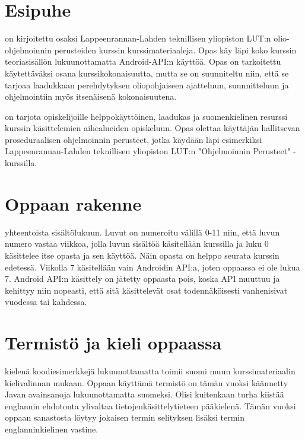 \documentclass{tufte-book}
\newcommand{\lutin}{Lappeenrannan-Lahden teknillisen yliopiston LUT:n }
\begin{document}

\section{Esipuhe}
\label{esipuhe}

 on kirjoitettu osaksi \lutin olio-ohjelmoinnin perusteiden kurssin
kurssimateriaaleja. Opas käy läpi koko kurssin  teoriasisällön lukuunottamatta Android-API:n
käyttöä. Opas on tarkoitettu käytettäväksi osana kurssikokonaisuutta, mutta se on suunniteltu
niin, että se tarjoaa laadukkaan perehdytyksen oliopohjaiseen ajatteluun, suunnitteluun ja
ohjelmointiin myös itsenäisenä kokonaisuutena.

 on tarjota opiskelijoille helppokäyttöinen,
laadukas ja suomenkielinen resurssi kurssin käsittelemien aihealueiden
opiskeluun. Opas olettaa käyttäjän hallitsevan proseduraalisen ohjelmoinnin
perusteet, jotka käydään läpi esimerkiksi \lutin "Ohjelmoinnin Perusteet" 
-kurssilla.


\section{Oppaan rakenne}
\label{rakenteesta}

 yhteentoista sisältölukuun. Luvut on numeroitu välillä 0-11 niin, että
luvun numero vastaa viikkoa, jolla luvun sisältöä käsitellään kurssilla ja luku 0 käsittelee itse
opasta ja sen käyttöä. Näin opasta on helppo seurata kurssin edetessä. Viikolla 7 käsitellään vain
Androidin API:a, joten oppaassa ei ole lukua 7. Android API:n käsittely on jätetty oppaasta pois,
koska API muuttuu ja kehittyy niin nopeasti, että sitä käsittelevät osat todennäköisesti
vanhenisivat vuodessa tai kahdessa.


\section{Termistö ja kieli oppaassa}
\label{kielestä}

 kielenä koodiesimerkkejä lukuunottamatta toimii suomi muun
kurssimateriaalin kielivalinnan mukaan. Oppaan käyttämä termistö on tämän vuoksi käännetty Javan
avainsanoja lukuunottamatta suomeksi. Olisi kuitenkaan turha kiistää englannin ehdotonta ylivaltaa
tietojenkäsittelytieteen pääkielenä. Tämän vuoksi oppaan sanastosta löytyy jokaisen termin
selityksen lisäksi termin englanninkielinen vastine.
\end{document}
